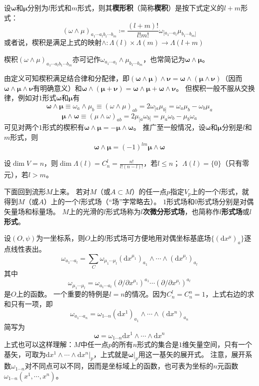 \begin{definition}
    设$\bm\omega$和$\bm\mu$分别为$l$形式和$m$形式，则其\textbf{楔形积}（简称\textbf{楔积}）是按下式定义的$l + m$形式：
    $$(\omega \wedge \mu)_{a_1 \cdots a_l b_1 \cdots b_m} \coloneq \frac{(l+m)!}{l!m!}\omega_{[a_1 \cdots a_l}\mu_{b_1 \cdots b_m]}$$
    或者说，楔积是满足上式的映射$\wedge \colon \Lambda(l) \times \Lambda(m) \to \Lambda(l + m)$
\end{definition}

楔积$(\omega \wedge \mu)_{a_1 \cdots a_l b_1 \cdots b_m}$亦可记作$\omega_{a_1 \cdots a_l} \wedge \mu_{b_1 \cdots b_m}$，也常简记为$\bm\omega \wedge \bm\mu$。

由定义可知楔积满足结合律和分配律，即$(\bm\omega \wedge \bm\mu) \wedge \bm\nu = \bm\omega \wedge (\bm\mu \wedge \bm\nu)$（因而$\bm\omega \wedge \bm\mu \wedge \bm\nu$有明确意义）和$\bm\omega \wedge (\bm\mu + \bm\nu) = \bm\omega \wedge \bm\mu + \bm\omega \wedge \bm\nu$。
但楔积一般不服从交换律，例如对$1$形式$\bm\omega$和$\bm\mu$有
$$\bm\omega \wedge \bm\mu \equiv \omega_a \wedge \mu_b \equiv (\omega \wedge \mu)_{ab} = 2\omega_{[a}\mu_{b]} = \omega_a\mu_b - \omega_b\mu_a$$
$$\bm\mu \wedge \bm\omega \equiv (\mu \wedge \omega)_{ab} = 2\mu_{[a}\omega_{b]} = \mu_a\omega_b - \mu_b\omega_a$$
可见对两个$1$形式的楔积有$\bm\omega \wedge \bm\mu = - \bm\mu \wedge \bm\omega$。
推广至一般情况，设$\bm\omega$和$\bm\mu$分别是$l$和$m$形式，则
$$\bm\omega \wedge \bm\mu = (-1)^{lm} \bm\mu \wedge \bm\omega$$

\begin{theorem}
    设$\dim V = n$，则$\dim \Lambda(l) = C_n^l = \frac{n!}{l!(n - l)!}$，若$l \leq n$；
    $\Lambda(l) = \{0\}$（只有零元），若$l > m$。
\end{theorem}

下面回到流形$M$上来。
若对$M$（或$A \subset M$）的任一点$p$指定$V_p$上的一个$l$形式，就得到$M$（或$A$）上的一个$l$形式场（``场''字常略去）。
$1$形式场和$0$形式场分别是对偶矢量场和标量场。
$M$上的光滑的$l$形式场称为\textbf{$l$次微分形式场}，也简称作\textbf{$l$形式场}或\textbf{$l$形式}。

设$(O, \psi)$为一坐标系，则$O$上的$l$形式场可方便地用对偶坐标基底场$\{(\mathrm{d}x^\mu)_a\}$逐点线性表出。
$$\omega_{a_1 \cdots a_l} = \sum_C \omega_{\mu_1 \cdots \mu_l}(\mathrm{d}x^{\mu_1})_{a_1} \wedge \cdots \wedge (\mathrm{d}x^{\mu_l})_{a_l}$$
其中
$$\omega_{\mu_1 \cdots \mu_l} = \omega_{a_1 \cdots a_l}(\partial / \partial x^{\mu_1})^{a_1} \cdots (\partial / \partial x^{\mu_l})^{a_l}$$
是$O$上的函数。
一个重要的特例是$l = n$的情况。因为$C_n^l = C_n^n = 1$，上式右边的求和只有一项，即
$$\omega_{a_1 \cdots a_n} = \omega_{1 \cdots n}(\mathrm{d}x^{1})_{a_1} \wedge \cdots \wedge (\mathrm{d}x^{n})_{a_n}$$
简写为
$$\bm\omega = \omega_{1 \cdots n}\mathrm{d}x^{1} \wedge \cdots \wedge \mathrm{d}x^{n}$$
上式也可以这样理解：$M$中任一点$p$的所有$n$形式的集合是$1$维矢量空间，只有一个基矢，可取为$\mathrm{d}x^{1} \wedge \cdots \wedge \mathrm{d}x^{n}|_p$，上式就是$\bm\omega|_p$用这一基矢的展开式。
注意，展开系数$\omega_{1 \cdots n}$对不同点可以不同，因而是坐标域上的函数，也可表为坐标的$n$元函数$\omega_{1 \cdots n}(x^1, \cdots, x^n)$。

